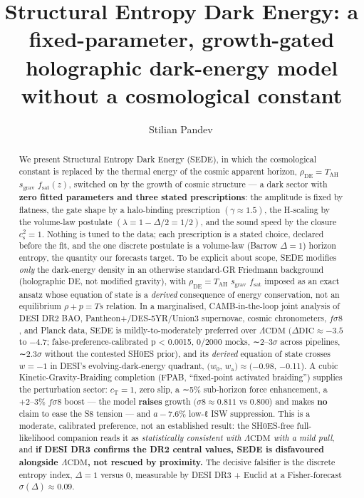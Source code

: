 \documentclass[preprint,12pt]{elsarticle}
\begin{document}
\begin{frontmatter}

\title{Structural Entropy Dark Energy: a fixed-parameter, growth-gated
holographic dark-energy model without a cosmological constant}

\author[ind]{Stilian Pandev\,}
\address[ind]{Independent researcher}

\begin{abstract}
We present Structural Entropy Dark Energy (SEDE), in which the
cosmological constant is replaced by the thermal energy of the cosmic
apparent horizon, \(\rho _\mathrm{DE} = T_\mathrm{AH}\)
\(s_{\mathrm{grav}}\) \(f_{\mathrm{sat}}(z)\), switched on by the growth
of cosmic structure --- a dark sector with \textbf{zero fitted
parameters and three stated prescriptions}: the amplitude is fixed by
flatness, the gate shape by a halo-binding prescription
\((\gamma  \approx  1.5)\), the H-scaling by the volume-law postulate
\((\lambda  = 1 - \Delta /2 = 1/2)\), and the sound speed by the closure
\(c_{\mathrm{s}}^{2} = 1\). Nothing is tuned to the data; each
prescription is a stated choice, declared before the fit, and the one
discrete postulate is a volume-law (Barrow \(\Delta  = 1\)) horizon
entropy, the quantity our forecasts target. To be explicit about scope,
SEDE modifies \emph{only} the dark-energy density in an otherwise
standard-GR Friedmann background (holographic DE, not modified gravity),
with \(\rho _\mathrm{DE} = T_\mathrm{AH}\) \(s_{\mathrm{grav}}\)
\(f_{\mathrm{sat}}\) imposed as an exact ansatz whose equation of state
is a \emph{derived} consequence of energy conservation, not an
equilibrium \(\rho  + p = Ts\) relation. In a marginalised,
CAMB-in-the-loop joint analysis of DESI DR2 BAO,
Pantheon+/DES-5YR/Union3 supernovae, cosmic chronometers, \(f\sigma 8\),
and Planck data, SEDE is mildly-to-moderately preferred over
\(\Lambda \mathrm{CDM}\) \((\Delta \mathrm{DIC} \approx  -3.5\) to
\(-4.7\); false-preference-calibrated p \textless{} 0.0015, 0/2000
mocks, ∼2--\(3\sigma\) across pipelines, ∼\(2.3\sigma\) without the
contested SH0ES prior), and its \emph{derived} equation of state crosses
\(w = -1\) in DESI's evolving-dark-energy quadrant, \((w_{0}\),
\(w_{\mathrm{a}}) \approx  (-0.98\), −0.11). A cubic
Kinetic-Gravity-Braiding completion (FPAB, ``fixed-point activated
braiding'') supplies the perturbation sector: \(c_{\mathrm{T}} = 1\),
zero slip, a ∼5\% sub-horizon force enhancement, a +2--3\% \(f\sigma 8\)
boost --- the model \textbf{raises} growth \((\sigma 8 \approx  0.811\)
vs 0.800) and makes \textbf{no} claim to ease the S8 tension --- and
\(a -7.6\)\% low-ℓ ISW suppression. This is a moderate, calibrated
preference, not an established result: the SH0ES-free full-likelihood
companion reads it as \emph{statistically consistent with
\(\Lambda \mathrm{CDM}\) with a mild pull}, and \textbf{if DESI DR3
confirms the DR2 central values, SEDE is disfavoured alongside
\(\Lambda \mathrm{CDM}\), not rescued by proximity.} The decisive
falsifier is the discrete entropy index, \(\Delta  = 1\) versus 0,
measurable by DESI DR3 + Euclid at a Fisher-forecast
\(\sigma (\Delta ) \approx  0.09\).
\end{abstract}


\end{frontmatter}
\end{document}
